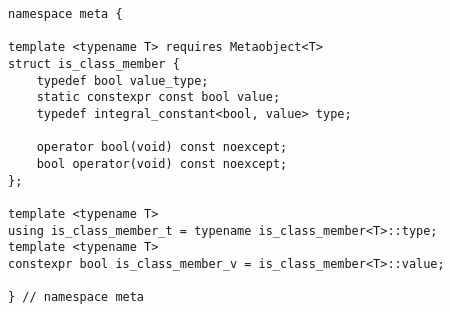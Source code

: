 
\begin{verbatim}
namespace meta {

template <typename T> requires Metaobject<T>
struct is_class_member {
	typedef bool value_type;
	static constexpr const bool value;
	typedef integral_constant<bool, value> type;

	operator bool(void) const noexcept;
	bool operator(void) const noexcept;
};

template <typename T>
using is_class_member_t = typename is_class_member<T>::type;
template <typename T>
constexpr bool is_class_member_v = is_class_member<T>::value;

} // namespace meta
\end{verbatim}
